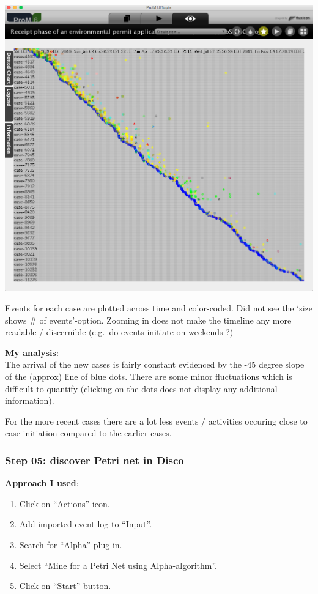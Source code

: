 \documentclass[]{article}
\begin{document}
\includegraphics{CoSeLoG_Step_04.png}

Events for each case are plotted across time and color-coded. Did not
see the `size shows \# of events'-option. Zooming in does not make the
timeline any more readable / discernible (e.g.~do events initiate on
weekends ?)

\textbf{My analysis}:\\The arrival of the new cases is fairly constant
evidenced by the -45 degree slope of the (approx) line of blue dots.
There are some minor fluctuations which is difficult to quantify
(clicking on the dots does not display any additional information).

For the more recent cases there are a lot less events / activities
occuring close to case initiation compared to the earlier cases.

\subsubsection{Step 05: discover Petri net in
Disco}\label{step-05-discover-petri-net-in-disco}

\textbf{Approach I used}:

\begin{enumerate}
\def\labelenumi{\arabic{enumi}.}
\itemsep1pt\parskip0pt
\item
  Click on ``Actions'' icon.\\
\item
  Add imported event log to ``Input''.\\
\item
  Search for ``Alpha'' plug-in.\\
\item
  Select ``Mine for a Petri Net using Alpha-algorithm''.
\item
  Click on ``Start'' button.
\end{enumerate}
\end{document}
